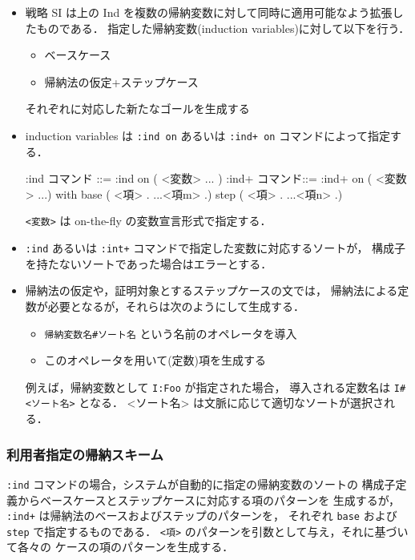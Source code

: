 \documentclass[a4paper,oneside,10pt,here]{memoir}
\newenvironment{vvtm}%
{\parskip=0pt\lineskip=0pt\begin{center}\begin{minipage}{0.8\textwidth}\begin{snugshade}}%
  {\end{snugshade}\end{minipage}\end{center}}
\begin{document}
\begin{itemize}
\item 戦略 SI は上の Ind を複数の帰納変数に対して同時に適用可能なよう拡張したものである．
指定した帰納変数(induction variables)に対して以下を行う．
  \begin{itemize}
    \item ベースケース
    \item 帰納法の仮定+ステップケース
  \end{itemize}
  それぞれに対応した新たなゴールを生成する
\item induction variables は \verb|:ind on| あるいは \verb|:ind+ on| コマンドによって指定する．

  \begin{vvtm}
    \begin{simplev}
    :ind コマンド ::= :ind on ( <変数> ... )      
    :ind+ コマンド::= :ind+ on ( <変数> ...) 
                     with base ( <項> . ...<項m> .)
                          step ( <項> . ...<項n> .)
    \end{simplev}
  \end{vvtm}
   \verb|<変数>| は on-the-fly の変数宣言形式で指定する．
 \item \verb|:ind| あるいは \verb|:int+| コマンドで指定した変数に対応するソートが，
   構成子を持たないソートであった場合はエラーとする．
 \item 帰納法の仮定や，証明対象とするステップケースの文では，
  帰納法による定数が必要となるが，それらは次のようにして生成する．
  \begin{itemize}
    \item \verb|帰納変数名#ソート名| という名前のオペレータを導入
    \item このオペレータを用いて(定数)項を生成する
    \end{itemize}
  例えば，帰納変数として \verb|I:Foo| が指定された場合，
  導入される定数名は \verb|I#<ソート名>| となる．
  <ソート名> は文脈に応じて適切なソートが選択される．
\end{itemize}

\subsubsection{利用者指定の帰納スキーム}\label{sec::ind+}
\verb|:ind| コマンドの場合，システムが自動的に指定の帰納変数のソートの
構成子定義からベースケースとステップケースに対応する項のパターンを
生成するが，
\verb|:ind+| は帰納法のベースおよびステップのパターンを，
それぞれ \verb|base| および \verb|step| で指定するものである．
\verb|<項>| のパターンを引数として与え，それに基づいて各々の
ケースの項のパターンを生成する．
\end{document}
